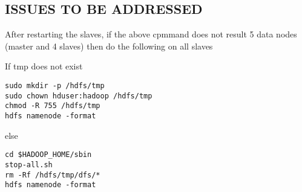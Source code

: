 \subsection{ISSUES TO BE ADDRESSED}

After restarting the slaves, if the above cpmmand does not result 5 data
nodes (master and 4 slaves) then do the following on all slaves

If tmp does not exist

\begin{lstlisting}
sudo mkdir -p /hdfs/tmp 
sudo chown hduser:hadoop /hdfs/tmp 
chmod -R 755 /hdfs/tmp 
hdfs namenode -format 
\end{lstlisting}

else

\begin{lstlisting}
cd $HADOOP_HOME/sbin
stop-all.sh
rm -Rf /hdfs/tmp/dfs/*
hdfs namenode -format
\end{lstlisting}

